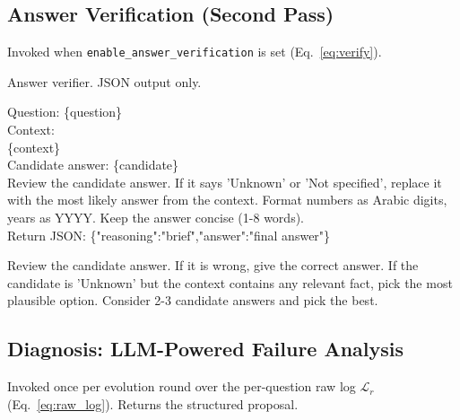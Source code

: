\subsection{Answer Verification (Second Pass)}
\label{app:prompt_verify}

Invoked when \texttt{enable\_answer\_verification} is set (Eq.~\ref{eq:verify}).

\begin{tcolorbox}[title={\textbf{Verifier: System Prompt}}, colback=green!3, colframe=green!40]
\small\ttfamily
Answer verifier. JSON output only.
\end{tcolorbox}

\begin{tcolorbox}[title={\textbf{Verifier Strict (default): User Prompt}}, breakable, colback=green!3, colframe=green!40]
\small\ttfamily
Question: \{question\}\\[0.3em]
Context:\\
\{context\}\\[0.3em]
Candidate answer: \{candidate\}\\[0.3em]
Review the candidate answer. If it says 'Unknown' or 'Not specified', replace it with the most likely answer from the context. Format numbers as Arabic digits, years as YYYY. Keep the answer concise (1-8 words).\\[0.3em]
Return JSON: \{"reasoning":"brief","answer":"final answer"\}
\end{tcolorbox}

\begin{tcolorbox}[title={\textbf{Verifier Multi-Candidate: Instruction Swap}}, colback=green!3, colframe=green!40]
\small\ttfamily
Review the candidate answer. If it is wrong, give the correct answer. If the candidate is 'Unknown' but the context contains any relevant fact, pick the most plausible option. Consider 2-3 candidate answers and pick the best.
\end{tcolorbox}

\subsection{Diagnosis: LLM-Powered Failure Analysis}
\label{app:prompt_diagnosis}

Invoked once per evolution round over the per-question raw log $\mathcal{L}_r$ (Eq.~\ref{eq:raw_log}).
Returns the structured proposal.

